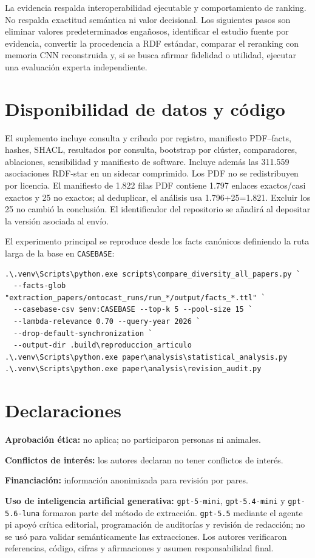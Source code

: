 \documentclass[11pt,a4paper]{article}
\begin{document}
La evidencia respalda interoperabilidad ejecutable y comportamiento de ranking. No respalda exactitud semántica ni valor decisional. Los siguientes pasos son eliminar valores predeterminados engañosos, identificar el estudio fuente por evidencia, convertir la procedencia a RDF estándar, comparar el reranking con memoria CNN reconstruida y, si se busca afirmar fidelidad o utilidad, ejecutar una evaluación experta independiente.

\section*{Disponibilidad de datos y código}
El suplemento incluye consulta y cribado por registro, manifiesto PDF--facts, hashes, SHACL, resultados por consulta, bootstrap por clúster, comparadores, ablaciones, sensibilidad y manifiesto de software. Incluye además las 311.559 asociaciones RDF-star en un sidecar comprimido. Los PDF no se redistribuyen por licencia. El manifiesto de 1.822 filas PDF contiene 1.797 enlaces exactos/casi exactos y 25 no exactos; al deduplicar, el análisis usa 1.796+25=1.821. Excluir los 25 no cambió la conclusión. El identificador del repositorio se añadirá al depositar la versión asociada al envío.

El experimento principal se reproduce desde los facts canónicos definiendo la ruta larga de la base en \texttt{CASEBASE}:

\begin{verbatim}
.\.venv\Scripts\python.exe scripts\compare_diversity_all_papers.py `
  --facts-glob "extraction_papers/ontocast_runs/run_*/output/facts_*.ttl" `
  --casebase-csv $env:CASEBASE --top-k 5 --pool-size 15 `
  --lambda-relevance 0.70 --query-year 2026 `
  --drop-default-synchronization `
  --output-dir .build\reproduccion_articulo
.\.venv\Scripts\python.exe paper\analysis\statistical_analysis.py
.\.venv\Scripts\python.exe paper\analysis\revision_audit.py
\end{verbatim}

\section*{Declaraciones}
\textbf{Aprobación ética:} no aplica; no participaron personas ni animales.\par
\textbf{Conflictos de interés:} los autores declaran no tener conflictos de interés.\par
\textbf{Financiación:} información anonimizada para revisión por pares.\par
\textbf{Uso de inteligencia artificial generativa:} \texttt{gpt-5-mini}, \texttt{gpt-5.4-mini} y \texttt{gpt-5.6-luna} formaron parte del método de extracción. \texttt{gpt-5.5} mediante el agente pi apoyó crítica editorial, programación de auditorías y revisión de redacción; no se usó para validar semánticamente las extracciones. Los autores verificaron referencias, código, cifras y afirmaciones y asumen responsabilidad final.
\end{document}
